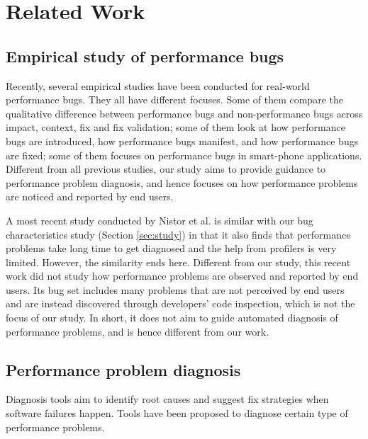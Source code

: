 \section{Related Work}

\subsection{Empirical study of performance bugs}
Recently, several empirical studies have been conducted for real-world
performance bugs. They all have different focuses.
Some of them \cite{Zaman2012MSR} compare the
qualitative difference between performance bugs and non-performance bugs 
across impact, context, fix and fix validation; some of them
\cite{PerfBug} look at 
how performance bugs are introduced, 
how performance bugs manifest, 
and how performance bugs are fixed; 
some of them
\cite{SmartphoneStudy} focuses on performance bugs in smart-phone applications.
Different from all previous studies, our study aims to provide guidance
to performance problem diagnosis, and hence focuses on how performance
problems are noticed and reported by end users. 

A most recent study conducted by Nistor et al. \cite{Nistor2013MSR} is similar
with our bug characteristics study (Section \ref{sec:study}) 
in that it also finds that performance problems take long time
to get diagnosed and the help from profilers is very limited. However, the
similarity ends here. Different from
our study, this recent work did not study how performance problems are
observed and reported by end users. Its bug set includes many problems
that are not perceived by end users and are instead discovered through 
developers' code inspection, which is not the focus of our study. In short,
it does not aim to guide automated diagnosis of performance problems, 
and is hence different
from our work.

\subsection{Performance problem diagnosis}
Diagnosis tools aim to identify root causes and suggest fix strategies when 
software failures happen. Tools have been proposed to diagnose certain
type of performance problems.

